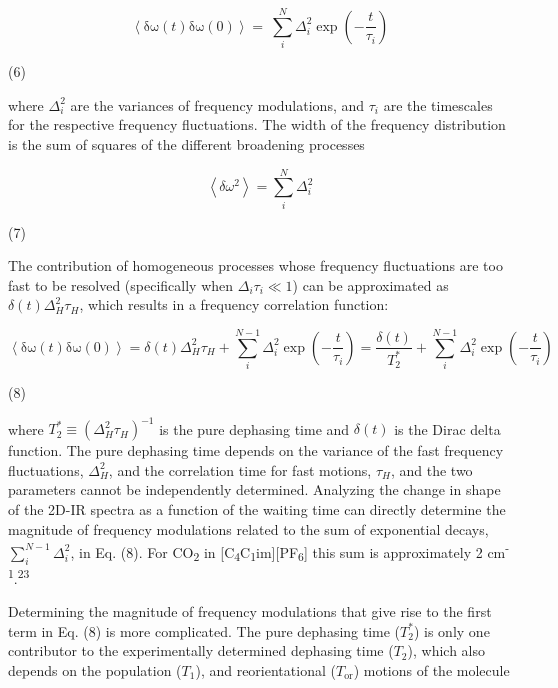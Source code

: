 \documentclass[]{article}
\begin{document}
\[\left\langle \text{δω}\left( t \right)\text{δω}\left( 0 \right) \right\rangle = \ \sum_{i}^{N}{\Delta_{i}^{2}\exp\left( - \frac{t}{\tau_{i}} \right)}\]

(6)

where \(\Delta_{i}^{2}\) are the variances of frequency modulations, and
\(\tau_{i}\) are the timescales for the respective frequency
fluctuations. The width of the frequency distribution is the sum of
squares of the different broadening processes

\[\left\langle \delta\omega^{2} \right\rangle = \sum_{i}^{N}\Delta_{i}^{2}\]

(7)

The contribution of homogeneous processes whose frequency fluctuations
are too fast to be resolved (specifically when
\(\Delta_{i}\tau_{i} \ll 1\)) can be approximated as
\(\delta\left( t \right)\Delta_{H}^{2}\tau_{H}\), which results in a
frequency correlation function:

\[\left\langle \text{δω}\left( t \right)\text{δω}\left( 0 \right) \right\rangle = \delta\left( t \right)\Delta_{H}^{2}\tau_{H} + \sum_{i}^{N - 1}{\Delta_{i}^{2}\exp\left( - \frac{t}{\tau_{i}} \right)} = \frac{\delta\left( t \right)}{T_{2}^{*}} + \sum_{i}^{N - 1}{\Delta_{i}^{2}\exp\left( - \frac{t}{\tau_{i}} \right)}\]

(8)

where \(T_{2}^{*} \equiv \left( \Delta_{H}^{2}\tau_{H} \right)^{- 1}\)
is the pure dephasing time and \(\delta\left( t \right)\) is the Dirac
delta function. The pure dephasing time depends on the variance of the
fast frequency fluctuations, \(\Delta_{H}^{2}\), and the correlation
time for fast motions, \(\tau_{H}\), and the two parameters cannot be
independently determined. Analyzing the change in shape of the 2D-IR
spectra as a function of the waiting time can directly determine the
magnitude of frequency modulations related to the sum of exponential
decays, \(\sum_{i}^{N - 1}\Delta_{i}^{2}\), in Eq. (8). For
CO\textsubscript{2} in
{[}C\textsubscript{4}C\textsubscript{1}im{]}{[}PF\textsubscript{6}{]}
this sum is approximately 2 cm\textsuperscript{-1}.\textsuperscript{23}

Determining the magnitude of frequency modulations that give rise to the
first term in Eq. (8) is more complicated. The pure dephasing time
(\(T_{2}^{*}\)) is only one contributor to the experimentally determined
dephasing time (\(T_{2}\)), which also depends on the population
(\(T_{1}\)), and reorientational (\(T_{\text{or}}\)) motions of the
molecule
\end{document}
